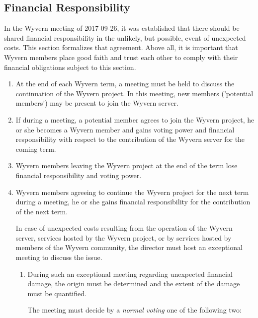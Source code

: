 \documentclass[a4paper]{article}
\begin{document}
\begin{appendices}
\begin{enumerate}
    
\end{enumerate}

\subsection{Financial Responsibility}
In the Wyvern meeting of 2017-09-26, it was established that there should be shared financial responsibility in the unlikely, but possible, event of unexpected costs. This section formalizes that agreement. Above all, it is important that Wyvern members place good faith and trust each other to comply with their financial obligations subject to this section.

\begin{enumerate}
    
    \item At the end of each Wyvern term, a meeting must be held to discuss the continuation of the Wyvern project. In this meeting, new members ('potential members') may be present to join the Wyvern server.

    \item If during a meeting, a potential member agrees to join the Wyvern project, he or she becomes a Wyvern member and gains voting power and financial responsibility with respect to the contribution of the Wyvern server for the coming term.
    
    \item Wyvern members leaving the Wyvern project at the end of the term lose financial responsibility and voting power.
    
    \item Wyvern members agreeing to continue the Wyvern project for the next term during a meeting, he or she gains financial responsibility for the contribution of the next term.
    
    \begin{item}
         In case of unexpected costs resulting from the operation of the Wyvern server, services hosted by the Wyvern project, or by services hosted by members of the Wyvern community, the director must host an exceptional meeting to discuss the issue.
        
        \begin{enumerate}
            \item During such an exceptional meeting regarding unexpected financial damage, the origin must be determined and the extent of the damage must be quantified.

            \begin{item}
                The meeting must decide by a \emph{normal voting} one of the following two: 
                

\end{item}
\end{enumerate}
\end{item}
\end{enumerate}
\end{appendices}
\end{document}
